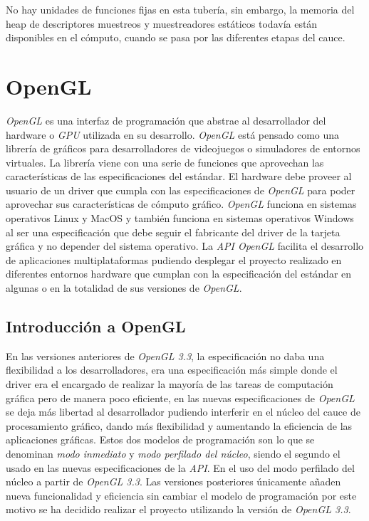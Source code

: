 \documentclass[a4paper]{book}
\begin{document}
No hay unidades de funciones fijas en esta tubería, sin embargo, la memoria del heap de descriptores muestreos y muestreadores
estáticos todavía están disponibles en el cómputo, cuando se pasa por las diferentes etapas del cauce.

\section{OpenGL}
\label{sec:OpenGL}

\textit{OpenGL} es una interfaz de programación que abstrae al desarrollador del hardware o \textit{GPU} utilizada en su desarrollo.
\textit{OpenGL} está pensado como una librería de gráficos para desarrolladores de videojuegos o simuladores de entornos virtuales.
La librería viene con una serie de funciones que aprovechan las características de las especificaciones del estándar.
El hardware debe proveer al usuario de un driver que cumpla con las especificaciones de \textit{OpenGL} para poder aprovechar
sus características de cómputo gráfico. \textit{OpenGL} funciona en sistemas operativos Linux y MacOS y también funciona en
sistemas operativos Windows al ser una especificación que debe seguir el fabricante del driver de la tarjeta gráfica y
no depender del sistema operativo. La \textit{API OpenGL} facilita el desarrollo de aplicaciones multiplataformas
pudiendo desplegar el proyecto realizado en diferentes entornos hardware que cumplan con la especificación del estándar
en algunas o en la totalidad de sus versiones de \textit{OpenGL}.

\subsection{Introducción a OpenGL}
\label{subsec:IntroOpenGL}

En las versiones anteriores de \textit{OpenGL 3.3}, la especificación no daba una flexibilidad a los desarrolladores, era una
especificación más simple donde el driver era el encargado de realizar la mayoría de las tareas de computación
gráfica pero de manera poco eficiente, en las nuevas especificaciones de \textit{OpenGL} se deja más libertad al desarrollador
pudiendo interferir en el núcleo del cauce de procesamiento gráfico, dando más flexibilidad y aumentando la eficiencia
de las aplicaciones gráficas. Estos dos modelos de programación son lo que se denominan \textit{modo inmediato} y \textit{modo perfilado
del núcleo}, siendo el segundo el usado en las nuevas especificaciones de la \textit{API}. En el uso del modo perfilado del núcleo
a partir de \textit{OpenGL 3.3}. Las versiones posteriores únicamente añaden nueva funcionalidad y eficiencia sin cambiar el
modelo de programación por este motivo se ha decidido realizar el proyecto utilizando la versión de \textit{OpenGL 3.3}.
\end{document}
